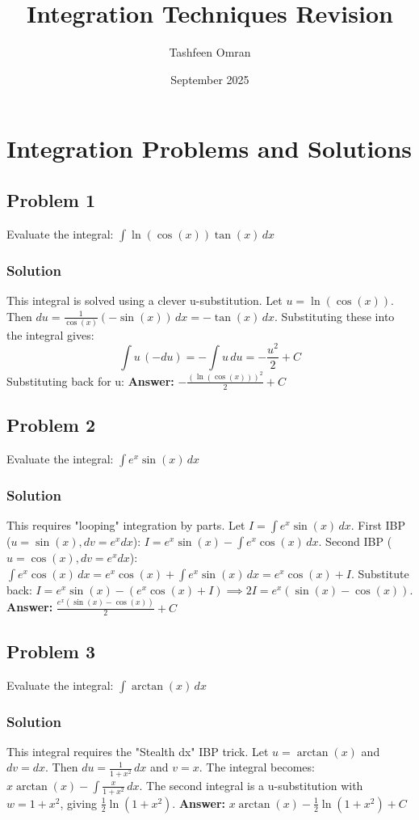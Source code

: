 \documentclass{article}
\title{Integration Techniques Revision}
\author{Tashfeen Omran}
\date{September 2025}
\begin{document}
\maketitle

\section{Integration Problems and Solutions}

\subsection{Problem 1}
Evaluate the integral: $ \int \ln(\cos(x)) \tan(x) \,dx $
\subsubsection*{Solution}
This integral is solved using a clever u-substitution.
Let $ u = \ln(\cos(x)) $.
Then $ du = \frac{1}{\cos(x)}(-\sin(x)) \,dx = -\tan(x) \,dx $.
Substituting these into the integral gives:
\[ \int u \,(-du) = -\int u \,du = -\frac{u^2}{2} + C \]
Substituting back for u:
\textbf{Answer:} $ -\frac{(\ln(\cos(x)))^2}{2} + C $


\subsection{Problem 2}
Evaluate the integral: $ \int e^x \sin(x) \,dx $
\subsubsection*{Solution}
This requires "looping" integration by parts. Let $I = \int e^x \sin(x) \,dx$.
First IBP ($u=\sin(x), dv=e^x dx$): $ I = e^x\sin(x) - \int e^x\cos(x) \,dx $.
Second IBP ($u=\cos(x), dv=e^x dx$): $ \int e^x\cos(x) \,dx = e^x\cos(x) + \int e^x\sin(x) \,dx = e^x\cos(x) + I $.
Substitute back: $ I = e^x\sin(x) - (e^x\cos(x) + I) \implies 2I = e^x(\sin(x) - \cos(x)) $.
\textbf{Answer:} $ \frac{e^x(\sin(x) - \cos(x))}{2} + C $


\subsection{Problem 3}
Evaluate the integral: $ \int \arctan(x) \,dx $
\subsubsection*{Solution}
This integral requires the "Stealth dx" IBP trick. Let $ u = \arctan(x) $ and $ dv = dx $.
Then $ du = \frac{1}{1+x^2} \,dx $ and $ v = x $.
The integral becomes: $ x\arctan(x) - \int \frac{x}{1+x^2} \,dx $.
The second integral is a u-substitution with $w = 1+x^2$, giving $\frac{1}{2}\ln(1+x^2)$.
\textbf{Answer:} $ x \arctan(x) - \frac{1}{2}\ln(1+x^2) + C $
\end{document}
